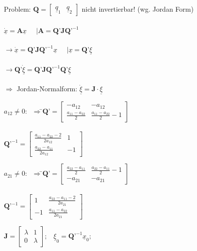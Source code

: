 \documentclass[a4paper,twocolumn,10pt]{article}
\begin{document}
Problem: $\textbf{Q}=\begin{bmatrix}\underline{q}_1 & \underline{q}_2\end{bmatrix}$ nicht invertierbar! (wg. Jordan Form)\\\\
$\underline{\dot{x}}=\textbf{A}\underline{x}\;\;\;\;\;|\textbf{A}=\textbf{Q'}\textbf{J}\textbf{Q'}^{-1}$\\\\
$\rightarrow\underline{\dot{x}}=\textbf{Q'}\textbf{J}\textbf{Q'}^{-1}\underline{x}\;\;\;\;\;|\underline{x}=\textbf{Q'}\underline{\xi}$\\\\
$\rightarrow\textbf{Q'}\underline{\dot\xi}=\textbf{Q'}\textbf{J}\textbf{Q'}^{-1}\textbf{Q'}\underline{\xi}$\\\\
$\Rightarrow$ Jordan-Normalform: $\dot{\underline{\xi}} =\textbf{J}\cdot \underline{\xi}$
\begin{tabbing}
$a_{12}\neq 0:\;\;\Rightarrow$\=$\textbf{Q'}=\begin{bmatrix}-a_{12} & -a_{12}\\ \frac{a_{11}-a_{22}}{2} & \frac{a_{11}-a_{22}}{2}-1\end{bmatrix}$\\\\
\>$\textbf{Q'}^{-1}=\begin{bmatrix}\frac{a_{11}-a_{22}-2}{2a_{12}} & 1 \\ \frac{a_{22}-a_{11}}{2a_{12}} & -1\end{bmatrix}$
\end{tabbing}
\begin{tabbing}
$a_{21}\neq 0:\;\;\Rightarrow$\=$\textbf{Q'}=\begin{bmatrix}\frac{a_{22}-a_{11}}{2} & \frac{a_{22}-a_{11}}{2}-1 \\ -a_{21} & -a_{21}\end{bmatrix}$\\\\
\>$\textbf{Q'}^{-1}=\begin{bmatrix}1 & \frac{a_{22}-a_{11}-2}{2a_{21}} \\ -1 & \frac{a_{11}-a_{22}}{2a_{21}} \end{bmatrix}$
\end{tabbing}
$\textbf{J}=\begin{bmatrix}\lambda & 1 \\ 0 & \lambda\end{bmatrix};\;\;\;\underline{\xi}_0=\textbf{Q'}^{-1}\underline{x}_0;\;\;\;$\\\\
\end{document}
